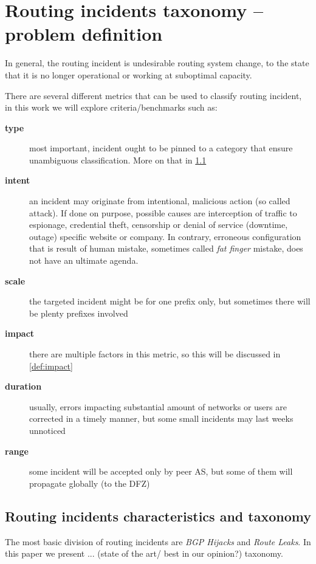 
\section{Routing incidents taxonomy -- problem definition}
\label{def}
In general, the routing incident is undesirable routing system change, to the state that it is no longer operational or working at suboptimal capacity.



There are several different metrics that can be used to classify routing incident, in this work we will explore criteria/benchmarks such as:
\begin{description}
    \item[\textbf{type}] most important, incident ought to be pinned to a category that ensure unambiguous classification. More on that in \ref{def:tax}
	\item[\textbf{intent}] an incident may originate from intentional, malicious action (so called attack). If done on purpose, possible causes are interception of traffic to espionage, credential theft, censorship or denial of service (downtime, outage) specific website or company. In contrary, erroneous configuration that is result of human mistake, sometimes called \emph{fat finger} mistake, does not have an ultimate agenda.
	\item[\textbf{scale}] the targeted incident might be for one prefix only, but sometimes there will be plenty prefixes involved
	\item[\textbf{impact}] there are multiple factors in this metric, so this will be discussed in \ref{def:impact}
	\item[\textbf{duration}] usually, errors impacting substantial amount of networks or users are corrected in a timely manner, but some small incidents may last weeks unnoticed
	\item[\textbf{range}] some incident will be accepted only by peer AS, but some of them will propagate globally (to the DFZ)
\end{description}

\subsection{Routing incidents characteristics and taxonomy}
\label{def:tax}
The most basic division of routing incidents are \emph{BGP Hijacks} and \emph{Route Leaks}. In this paper we present ... (state of the art/ best in our opinion?) taxonomy. 


